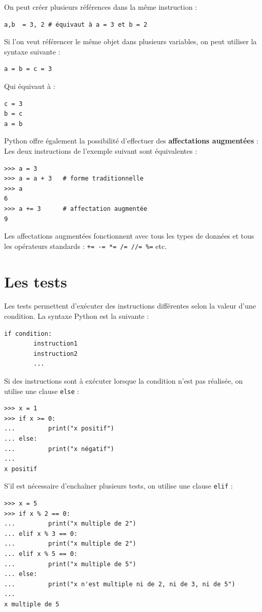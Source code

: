 \documentclass[12pt, a4paper]{article}
\begin{document}
On peut créer plusieurs références dans la même instruction :
\begin{lstlisting}
a,b  = 3, 2	# équivaut à a = 3 et b = 2
\end{lstlisting}

Si l'on veut référencer le même objet dans plusieurs variables, on peut utiliser la syntaxe suivante :
\begin{lstlisting}
a = b = c = 3
\end{lstlisting}

Qui équivaut à :
\begin{lstlisting}
c = 3
b = c
a = b
\end{lstlisting}

Python offre également la possibilité d'effectuer des \textbf{affectations augmentées} :  Les deux instructions de l'exemple suivant sont équivalentes : 
\begin{lstlisting}
>>> a = 3
>>> a = a + 3	# forme traditionnelle
>>> a
6
>>> a += 3		# affectation augmentée
9
\end{lstlisting}

Les affectations augmentées fonctionnent avec tous les types de données et tous les opérateurs standards : \lstinline{+= -= *= /= //= %=} etc.



\section{Les tests}
Les tests permettent d'exécuter des instructions différentes selon la valeur d'une condition. La syntaxe Python est la suivante :
\begin{lstlisting}
if condition:
		instruction1
		instruction2
		...
\end{lstlisting}

Si des instructions sont à exécuter lorsque la condition n'est pas réalisée, on utilise une clause \lstinline{else} :
\begin{lstlisting}
>>> x = 1
>>> if x >= 0:
... 		print("x positif")
... else:
... 		print("x négatif")
...
x positif
\end{lstlisting}

S'il est nécessaire d'enchaîner plusieurs tests, on utilise une clause \lstinline{elif} :
\begin{lstlisting}
>>> x = 5
>>> if x % 2 == 0:
... 		print("x multiple de 2")
... elif x % 3 == 0:
... 		print("x multiple de 2")
... elif x % 5 == 0:
... 		print("x multiple de 5")
... else:
... 		print("x n'est multiple ni de 2, ni de 3, ni de 5")
...
x multiple de 5
\end{lstlisting}
\end{document}
